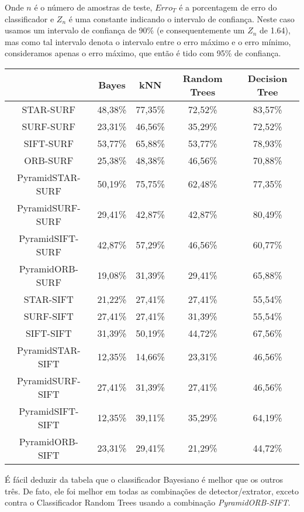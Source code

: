 \documentclass[a4paper,11pt]{article}
\begin{document}
  Onde $n$ é o número de amostras de teste, $Erro_T$ é a porcentagem de erro do
  classificador e $Z_n$ é uma constante indicando o intervalo de confiança.
  Neste caso usamos um intervalo de confiança de 90\% (e consequentemente um
  $Z_n$ de 1.64), mas como tal intervalo denota o intervalo entre o erro máximo
  e o erro mínimo, consideramos apenas o erro máximo, que então é tido com 95\%
  de confiança.

  \vspace{15pt}
  \hspace{-25pt}
  \begin{tabular}{|c|c|c|c|c|}
    \hline
     & Bayes & kNN & Random Trees & Decision Tree \\
    \hline
        STAR-SURF & 48,38\% & 77,35\% & 72,52\% & 83,57\% \\
        SURF-SURF & 23,31\% & 46,56\% & 35,29\% & 72,52\% \\
        SIFT-SURF & 53,77\% & 65,88\% & 53,77\% & 78,93\%\\
        ORB-SURF & 25,38\% & 48,38\% & 46,56\% & 70,88\% \\
        PyramidSTAR-SURF & 50,19\% & 75,75\% & 62,48\% & 77,35\% \\
        PyramidSURF-SURF & 29,41\% & 42,87\% & 42,87\% & 80,49\% \\
        PyramidSIFT-SURF & 42,87\% & 57,29\% & 46,56\% & 60,77\% \\
        PyramidORB-SURF & 19,08\% & 31,39\% & 29,41\% & 65,88\% \\
        STAR-SIFT & 21,22\% & 27,41\% & 27,41\% & 55,54\% \\
        SURF-SIFT & 27,41\% & 27,41\% & 31,39\% & 55,54\% \\
        SIFT-SIFT & 31,39\% & 50,19\% & 44,72\% & 67,56\% \\
        PyramidSTAR-SIFT & 12,35\% & 14,66\% & 23,31\% & 46,56\% \\
        PyramidSURF-SIFT & 27,41\% & 31,39\% & 27,41\% & 46,56\% \\
        PyramidSIFT-SIFT & 12,35\% & 39,11\% & 35,29\% & 64,19\% \\
        PyramidORB-SIFT & 23,31\% & 29,41\% & 21,29\% & 44,72\% \\
        
    \hline
  \end{tabular}
  \bigskip

  É fácil deduzir da tabela que o classificador Bayesiano é melhor que os outros
  três. De fato, ele foi melhor em todas as combinações de detector/extrator,
  exceto contra o Classificador Random Trees usando a combinação
  \textit{PyramidORB-SIFT}.
\end{document}
